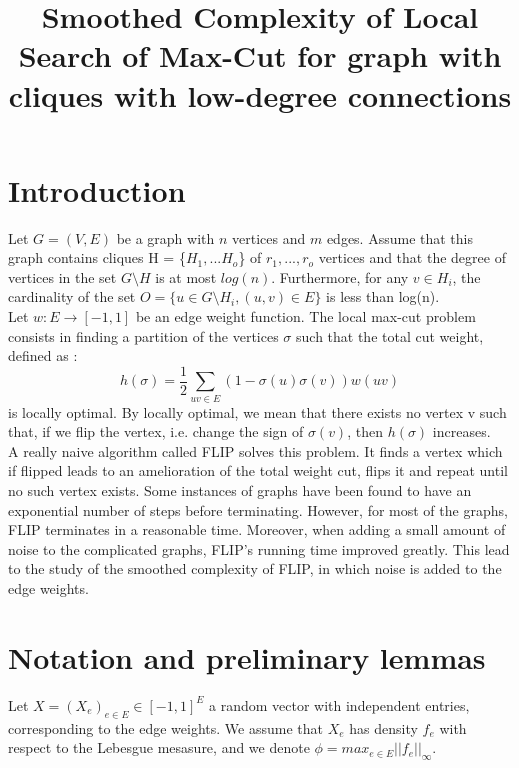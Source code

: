\documentclass[12pt]{article}
\title{Smoothed Complexity of Local Search of Max-Cut for graph with cliques with low-degree connections}
\begin{document}
\maketitle

\section{Introduction}

Let $G = (V,E)$ be a graph with $n$ vertices and $m$ edges. Assume that this graph contains cliques H = \{$H_1, ... H_o$\} of $r_1, ... , r_o$ vertices and that the degree of vertices in the set $G \setminus H$ is at most $log(n)$. Furthermore, for any $v \in H_i$, the cardinality of the set $O = \{u \in G \setminus H_i, (u, v) \in E\}$ is less than log(n). \\
Let $w : E \rightarrow [-1, 1]$ be an edge weight function. The local max-cut problem consists in finding a partition of the vertices $\sigma$ such that the total cut weight, defined as :
\begin{equation*}
h(\sigma) = \dfrac{1}{2}\sum_{uv \in E}(1 - \sigma(u)\sigma(v))w(uv)
\end{equation*}
is locally optimal. By locally optimal, we mean that there exists no vertex v such that, if we flip the vertex, i.e. change the sign of $\sigma(v)$, then $h(\sigma)$ increases.\\ 

A really naive algorithm called FLIP solves this problem. It finds a vertex which if flipped leads to an amelioration of the total weight cut, flips it and repeat until no such vertex exists. Some instances of graphs have been found to have an exponential number of steps before terminating. However, for most of the graphs, FLIP terminates in a reasonable time. Moreover, when adding a small amount of noise to the complicated graphs, FLIP's running time improved greatly. This lead to the study of the smoothed complexity of FLIP, in which noise is added to the edge weights.

\section{Notation and preliminary lemmas}

Let $X = (X_e)_{e \in E} \in [-1, 1]^E$ a random vector with independent entries, corresponding to the edge weights. We assume that $X_e$ has density $f_e$ with respect to the Lebesgue mesasure, and we denote $\phi = max_{e \in E}||f_e||_\infty$. 
\end{document}
